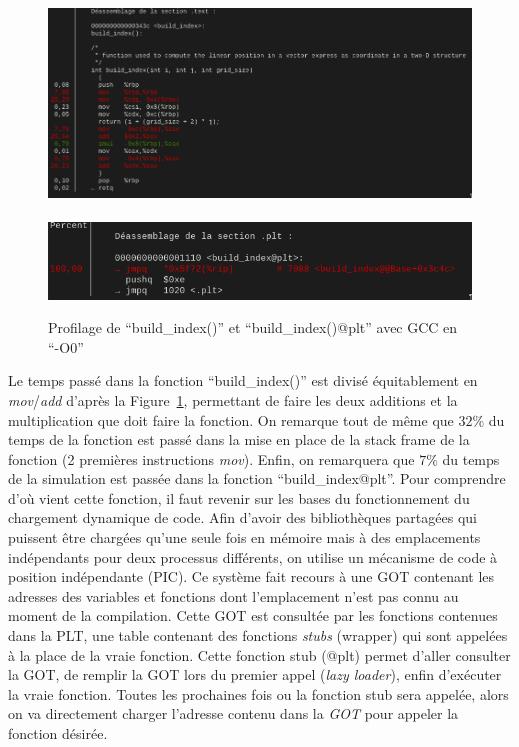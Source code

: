 \documentclass[12pt,a4paper]{article}
\begin{document}
\begin{figure}
    \centering
    \includegraphics[scale=0.40]{figures/optims/gcc-O0/build_index.png}
    \\ \phantom{ } \\
    \includegraphics[scale=0.55]{figures/optims/gcc-O0/build_index@plt.png}
    \caption{Profilage de \enquote{build\_index()} et \enquote{build\_index()@plt} avec \ac{GCC} en \enquote{-O0}}
    \label{fig.optim.build_index}
\end{figure}

Le temps passé dans la fonction \enquote{build\_index()} est divisé
équitablement en \textit{mov}/\textit{add} d'après la
Figure~\ref{fig.optim.build_index}, permettant de faire les deux additions et la
multiplication que doit faire la fonction. On remarque tout de même que $32\%$
du temps de la fonction est passé dans la mise en place de la stack frame de la
fonction (2 premières instructions \textit{mov}). Enfin, on remarquera que $7\%$
du temps de la simulation est passée dans la fonction \enquote{build\_index@plt}.
Pour comprendre d’où vient cette fonction, il faut revenir sur les bases du
fonctionnement du chargement dynamique de code. Afin d’avoir des bibliothèques
partagées qui puissent être chargées qu’une seule fois en mémoire mais à des
emplacements indépendants pour deux processus différents, on utilise un
mécanisme de code à position indépendante (\ac{PIC}). Ce système fait recours à
une \ac{GOT} contenant les adresses des variables et fonctions dont
l’emplacement n’est pas connu au moment de la compilation. Cette \ac{GOT} est
consultée par les fonctions contenues dans la \ac{PLT}, une table contenant des
fonctions \textit{stubs} (wrapper) qui sont appelées à la place de la vraie
fonction. Cette fonction stub (@plt) permet d’aller consulter la \ac{GOT}, de
remplir la \ac{GOT} lors du premier appel (\textit{lazy loader}), enfin
d’exécuter la vraie fonction. Toutes les prochaines fois ou la fonction stub
sera appelée, alors on va directement charger l’adresse contenu dans la
\textit{GOT} pour appeler la fonction désirée.
\end{document}
